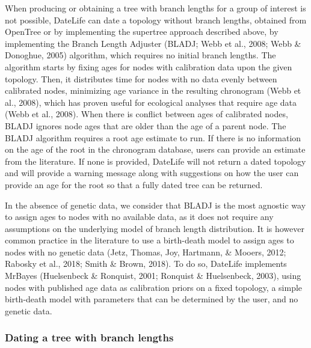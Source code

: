 \documentclass[english,man]{apa6}
\begin{document}
When producing or obtaining a tree with branch lengths for a group of interest is not possible, DateLife can date a topology without branch lengths, obtained from OpenTree or by implementing the supertree approach described above, by implementing the Branch Length Adjuster (BLADJ; Webb et al., 2008; Webb \& Donoghue, 2005) algorithm, which requires no initial branch lengths.
The algorithm starts by fixing ages for nodes with calibration data upon the given topology. Then, it distributes time for nodes with no data evenly between calibrated nodes, minimizing age variance in the resulting chronogram (Webb et al., 2008), which has proven useful for ecological analyses that require age data (Webb et al., 2008).
When there is conflict between ages of calibrated nodes, BLADJ ignores node ages that are older than the age of a parent node.
The BLADJ algorithm requires a root age estimate to run. If there is no information on the age of the root in the chronogram database, users can provide an estimate from the literature. If none is provided, DateLife will not return a dated topology and will provide a warning message along with suggestions on how the user can provide an age for the root so that a fully dated tree can be returned.

In the absence of genetic data, we consider that BLADJ is the most agnostic way to assign ages to nodes with no available data, as it does not require any assumptions on the underlying model of branch length distribution. It is however common practice in the literature to use a birth-death model to assign ages to nodes with no genetic data (Jetz, Thomas, Joy, Hartmann, \& Mooers, 2012; Rabosky et al., 2018; Smith \& Brown, 2018). To do so, DateLife implements MrBayes (Huelsenbeck \& Ronquist, 2001; Ronquist \& Huelsenbeck, 2003), using nodes with published age data as calibration priors on a fixed topology, a simple birth-death model with parameters that can be determined by the user, and no genetic data.

\hypertarget{dating-a-tree-with-branch-lengths}{%
\subsubsection{Dating a tree with branch lengths}\label{dating-a-tree-with-branch-lengths}}
\end{document}
